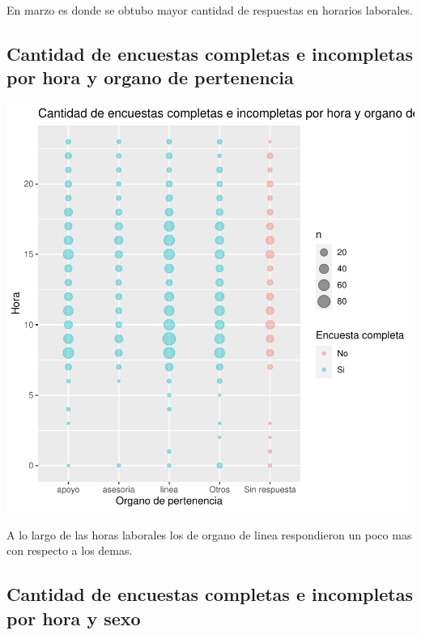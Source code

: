 \documentclass{article}
\begin{document}
En marzo es donde se obtubo mayor cantidad de respuestas en horarios laborales.

\subsection{Cantidad de encuestas completas e incompletas por hora y organo de pertenencia}

\includegraphics{seguimientov3-042}

A lo largo de las horas laborales los de organo de linea respondieron un poco mas con respecto a los demas.

\subsection{Cantidad de encuestas completas e incompletas por hora y sexo}
\end{document}

